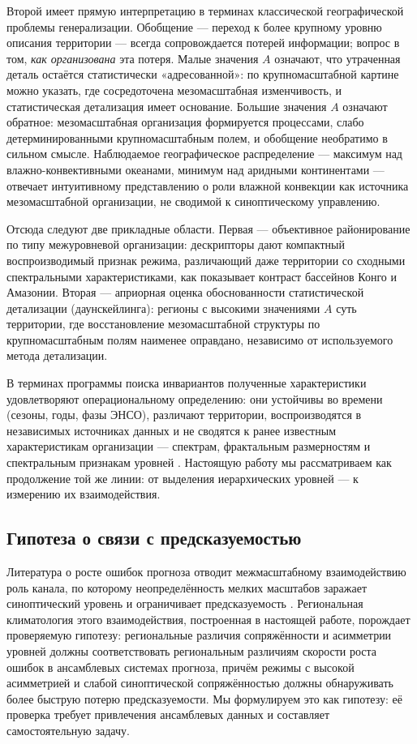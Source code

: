 \documentclass[11pt,a4paper]{article}
\begin{document}
Второй имеет прямую интерпретацию в терминах классической географической проблемы генерализации. Обобщение --- переход к более крупному уровню описания территории --- всегда сопровождается потерей информации; вопрос в том, \emph{как организована} эта потеря. Малые значения $A$ означают, что утраченная деталь остаётся статистически «адресованной»: по крупномасштабной картине можно указать, где сосредоточена мезомасштабная изменчивость, и статистическая детализация имеет основание. Большие значения $A$ означают обратное: мезомасштабная организация формируется процессами, слабо детерминированными крупномасштабным полем, и обобщение необратимо в сильном смысле. Наблюдаемое географическое распределение --- максимум над влажно-конвективными океанами, минимум над аридными континентами --- отвечает интуитивному представлению о роли влажной конвекции как источника мезомасштабной организации, не сводимой к синоптическому управлению.

Отсюда следуют две прикладные области. Первая --- объективное районирование по типу межуровневой организации: дескрипторы дают компактный воспроизводимый признак режима, различающий даже территории со сходными спектральными характеристиками, как показывает контраст бассейнов Конго и Амазонии. Вторая --- априорная оценка обоснованности статистической детализации (даунскейлинга): регионы с высокими значениями $A$ суть территории, где восстановление мезомасштабной структуры по крупномасштабным полям наименее оправдано, независимо от используемого метода детализации.

В терминах программы поиска инвариантов \cite{Puzachenko2010} полученные характеристики удовлетворяют операциональному определению: они устойчивы во времени (сезоны, годы, фазы ЭНСО), различают территории, воспроизводятся в независимых источниках данных и не сводятся к ранее известным характеристикам организации --- спектрам, фрактальным размерностям и спектральным признакам уровней \cite{Krenke2019}. Настоящую работу мы рассматриваем как продолжение той же линии: от выделения иерархических уровней --- к измерению их взаимодействия.

\subsection{Гипотеза о связи с предсказуемостью}

Литература о росте ошибок прогноза отводит межмасштабному взаимодействию роль канала, по которому неопределённость мелких масштабов заражает синоптический уровень и ограничивает предсказуемость \cite{Lorenz1969,Zhang2007,RotunnoSnyder2008,Judt2020}. Региональная климатология этого взаимодействия, построенная в настоящей работе, порождает проверяемую гипотезу: региональные различия сопряжённости и асимметрии уровней должны соответствовать региональным различиям скорости роста ошибок в ансамблевых системах прогноза, причём режимы с высокой асимметрией и слабой синоптической сопряжённостью должны обнаруживать более быструю потерю предсказуемости. Мы формулируем это как гипотезу: её проверка требует привлечения ансамблевых данных и составляет самостоятельную задачу.
\end{document}
